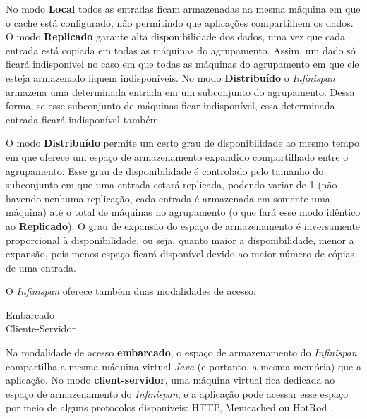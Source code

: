 \documentclass[11pt,twoside,a4paper]{book}
\begin{document}
No modo \textbf{Local} todos as entradas ficam armazenadas na mesma máquina em que o cache está configurado, não permitindo 
que aplicações compartilhem os dados. O modo \textbf{Replicado} garante alta disponibilidade dos dados, uma vez que cada 
entrada está copiada em todas as máquinas do agrupamento. Assim, um dado só ficará indisponível no caso em que todas as 
máquinas do agrupamento em que ele esteja armazenado fiquem indisponíveis. No modo \textbf{Distribuído} o \emph{Infinispan} 
armazena uma determinada entrada em um subconjunto do agrupamento. Dessa forma, se esse subconjunto de máquinas ficar indisponível, 
essa determinada entrada ficará indisponível também. 

O modo \textbf{Distribuído} permite um certo grau de disponibilidade ao mesmo tempo em que oferece um espaço de armazenamento
expandido compartilhado entre o agrupamento. Esse grau de disponibilidade é controlado pelo tamanho do subconjunto em que uma
entrada estará replicada, podendo variar de 1 (não havendo nenhuma replicação, cada entrada é armazenada em somente uma máquina) até
o total de máquinas no agrupamento (o que fará esse modo idêntico ao \textbf{Replicado}). O grau de expansão do espaço de armazenamento
é inversamente proporcional à disponibilidade, ou seja, quanto maior a disponibilidade, menor a expansão, pois menos espaço ficará
disponível devido ao maior número de cópias de uma entrada.

O \emph{Infinispan} oferece também duas modalidades de acesso:

\begin{description}
	\item[Embarcado]
	\item[Cliente-Servidor] 
\end{description}

Na modalidade de acesso \textbf{embarcado}, o espaço de armazenamento do \emph{Infinispan} compartilha a mesma máquina virtual \emph{Java}
(e portanto, a mesma memória) que a aplicação. No modo \textbf{client-servidor}, uma máquina virtual fica dedicada ao espaço de armazenamento
do \emph{Infinispan}, e a aplicação pode acessar esse espaço por meio de alguns protocolos disponíveis: HTTP, Memcached ou HotRod \cite{infinispan}.


\end{document}
